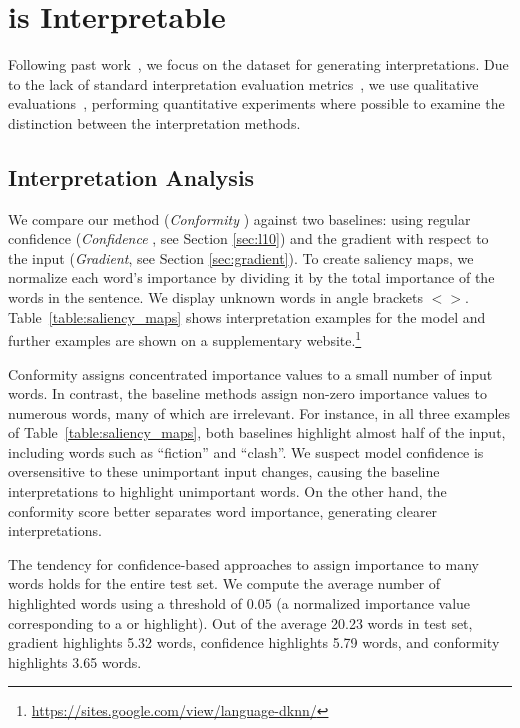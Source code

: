 \section{\dknn{} is Interpretable}
\label{sec:interpretation}

Following past work~\cite{li2016understanding, murdoch2018cd}, we focus on the
 dataset for generating interpretations. Due to the lack of standard
interpretation evaluation metrics~\cite{doshivelez2017towards},
we use qualitative evaluations~\cite{smilkov2017smoothgrad,
sundararajan2017axiomatic, li2016understanding}, performing
quantitative experiments where possible to examine the distinction
between the interpretation methods.

\subsection{Interpretation Analysis}



We compare our method (\emph{Conformity \loo{}}) against two baselines: \loo{}
using regular confidence (\emph{Confidence \loo{}}, see Section \ref{sec:l10}) and the gradient with respect to the
input (\emph{Gradient}, see Section \ref{sec:gradient}). To create saliency maps, we normalize each word's importance
by dividing it by the total importance of the words in
the sentence. We display unknown words in angle brackets $<>$.
Table~\ref{table:saliency_maps} shows  interpretation examples
for the \bilstm{} model and further examples are shown on a
supplementary website.\footnote{\url{https://sites.google.com/view/language-dknn/}}

Conformity \loo{} assigns concentrated importance values to
a small number of input words. In contrast, the baseline methods
assign non-zero importance values to numerous words, many of which
are irrelevant.
For instance, in all three examples of Table~\ref{table:saliency_maps}, 
both baselines highlight almost half of the input, including words such as
``fiction'' and ``clash''. We suspect model confidence is oversensitive to
these unimportant input changes,
causing the baseline interpretations to highlight unimportant words. On the other hand, 
the conformity score better separates word importance, generating clearer interpretations.

The tendency for confidence-based approaches to assign importance 
to many words holds for the entire test set. We compute the average number of
highlighted words using a threshold of $0.05$ 
(a normalized importance value corresponding to a  or  highlight). Out
of the average 20.23 words in  test set, gradient highlights 5.32 words,
confidence \loo{} highlights 5.79 words, and conformity \loo{} highlights 3.65 words.

